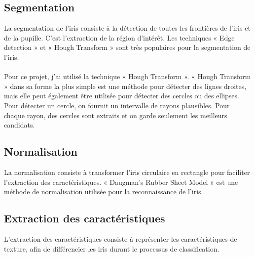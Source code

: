 \documentclass[12pt,twoside,letterpaper]{article}
\begin{document}
\subsection{Segmentation}
La segmentation de l’iris consiste à la détection de toutes les frontières de l’iris et de la pupille. C’est l’extraction de la région d’intérêt. Les techniques « Edge detection » et « Hough Transform » sont très populaires pour la segmentation de l’iris. 
\\~\\
Pour ce projet, j'ai utilisé la technique « Hough Transform ». « Hough Transform » dans sa forme la plus simple est une méthode pour détecter des lignes droites, mais elle peut également être utilisée pour détecter des cercles ou des ellipses. Pour détecter un cercle, on fournit un intervalle de rayons plausibles. Pour chaque rayon, des cercles sont extraits et on garde seulement les meilleurs candidats.

\subsection{Normalisation}
La normalisation consiste à transformer l’iris circulaire en rectangle pour faciliter l’extraction des caractéristiques. « Daugman’s Rubber Sheet Model » est une méthode de normalisation utilisée pour la reconnaissance de l’iris.

\subsection{Extraction des caractéristiques}
L’extraction des caractéristiques consiste à représenter les caractéristiques de texture, afin de différencier les iris durant le processus de classification.
\end{document}
